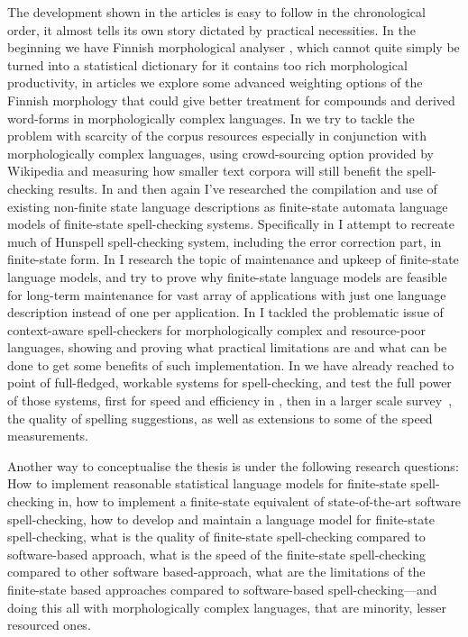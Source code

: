 \documentclass[officiallayout]{unihelcompling}
\begin{document}
The development shown in the articles is easy to follow in the chronological
order, it almost tells its own story dictated by practical necessities. In the
beginning we have Finnish morphological analyser \citep{pirinen2008suomen},
which cannot quite simply be turned into a statistical dictionary for it
contains too rich morphological productivity, in articles
\citep{pirinen2009weighted,pirinen2009weighting} we explore some advanced
weighting options of the Finnish morphology that could give better treatment
for compounds and derived word-forms in morphologically complex languages. In
\citep{pirinen2010finitestate} we try to tackle the problem with scarcity of the
corpus resources especially in conjunction with morphologically complex
languages, using crowd-sourcing option provided by Wikipedia and measuring how
smaller text corpora will still benefit the spell-checking results. In
\citep{pirinen2010building,pirinen2010creating} and then again
\citep{pirinen2012compiling} I've researched the compilation and use of existing
non-finite state language descriptions as finite-state automata language models
of finite-state spell-checking systems. Specifically in
\citep{pirinen2010creating} I attempt to recreate much of Hunspell
spell-checking system, including the error correction part, in finite-state
form. In \citep{pirinen2011modularisation} I research the topic of maintenance
and upkeep of finite-state language models, and try to prove why finite-state
language models are feasible for long-term maintenance for vast array of
applications with just one language description instead of one per application.
In \citep{pirinen2012improving} I tackled the problematic issue of context-aware
spell-checkers for morphologically complex and resource-poor languages, showing
and proving what practical limitations are and what can be done to get some
benefits of such implementation. In
\citep{pirinen2012effects,pirinen2013quality} we have already reached to point
of full-fledged, workable systems for spell-checking, and test the full power
of those systems, first for speed and efficiency in \citep{pirinen2012effects},
then in a larger scale survey~\citep{pirinen2013quality}, the quality of
spelling suggestions, as well as extensions to some of the speed measurements.

Another way to conceptualise the thesis is under the following research
questions: How to implement reasonable statistical language models for
finite-state spell-checking in, how to implement a finite-state equivalent of
state-of-the-art software spell-checking, how to develop and maintain a
language model for finite-state spell-checking, what is the quality of
finite-state spell-checking compared to software-based approach, what is the
speed of the finite-state spell-checking compared to other software
based-approach, what are the limitations of the finite-state based approaches
compared to software-based spell-checking---and doing this all with
morphologically complex languages, that are minority, lesser resourced ones.
\end{document}
